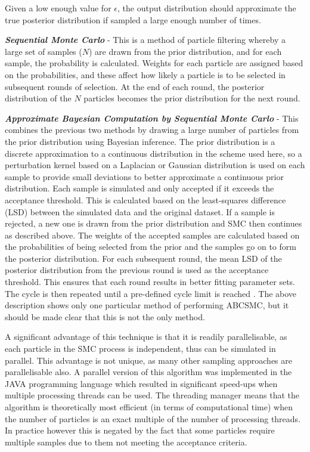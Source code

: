 Given a low enough value for $\epsilon$, the output distribution should approximate the true posterior distribution if sampled a large enough number of times.

\textbf{\textit{Sequential Monte Carlo}} - This is a method of particle filtering whereby a large set of samples ($N$) are drawn from the prior distribution, and for each sample, the probability is calculated. Weights for each particle are assigned based on the probabilities, and these affect how likely a particle is to be selected in subsequent rounds of selection. At the end of each round, the posterior distribution of the $N$ particles becomes the prior distribution for the next round.

\textbf{\textit{Approximate Bayesian Computation by Sequential Monte Carlo}} - This combines the previous two methods by drawing a large number of particles from the prior distribution using Bayesian inference. The prior distribution is a discrete approximation to a continuous distribution in the scheme used here, so a perturbation kernel based on a Laplacian or Gaussian distribution is used on each sample to provide small deviations to better approximate a continuous prior distribution. Each sample is simulated and only accepted if it exceeds the acceptance threshold. This is calculated based on the least-squares difference (LSD) between the simulated data and the original dataset. If a sample is rejected, a new one is drawn from the prior distribution and SMC then continues as described above. The weights of the accepted samples are calculated based on the probabilities of being selected from the prior and the samples go on to form the posterior distribution. For 
each subsequent round, the mean LSD of the
posterior distribution from the previous round is used as the acceptance threshold. This ensures that each round results in better fitting parameter sets. The cycle is then repeated until a pre-defined cycle limit is reached \cite{Toni2009}. The above description shows only one particular method of performing ABCSMC, but it should be made clear that this is not the only method.

A significant advantage of this technique is that it is readily parallelisable, as each particle in the SMC process is independent, thus can be simulated in parallel. This advantage is not unique, as many other sampling approaches are parallelisable also. A parallel version of this algorithm was implemented in the JAVA programming language which resulted in significant speed-ups when multiple processing threads can be used. The threading manager means that the algorithm is theoretically most efficient (in terms of computational time) when the number of particles is an exact multiple of the number of processing threads. In practice however this is negated by the fact that some particles require multiple samples due to them not meeting the acceptance criteria.

